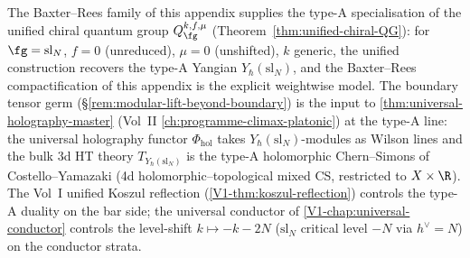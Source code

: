 \begin{remark}[Type-A Baxter--Rees family as the
$\fg = \mathrm{sl}_N$ specialisation of the unified $Q_\fg^{k,f,\mu}$;
\ClaimStatusConditional]
\label{rem:typeA-baxter-rees-uhm}
The Baxter--Rees family of this appendix supplies the type-A
specialisation of the unified chiral quantum group
$Q_\fg^{k,f,\mu}$
(Theorem~\ref{thm:unified-chiral-QG}): for
$\fg = \mathrm{sl}_N$, $f = 0$ (unreduced), $\mu = 0$ (unshifted),
$k$ generic, the unified construction recovers the type-A Yangian
$Y_\hbar(\mathrm{sl}_N)$, and the Baxter--Rees compactification
of this appendix is the explicit weightwise model. The boundary
tensor germ
(\S\ref{rem:modular-lift-beyond-boundary}) is the input to
\cref{thm:universal-holography-master} (Vol~II
\cref{ch:programme-climax-platonic}) at the type-A line: the universal
holography functor $\Phi_{\mathrm{hol}}$ takes
$Y_\hbar(\mathrm{sl}_N)$-modules as Wilson lines and the bulk
$3$d HT theory $T_{Y_\hbar(\mathrm{sl}_N)}$ is the type-A holomorphic
Chern--Simons of Costello--Yamazaki (4d holomorphic--topological
mixed CS, restricted to $X\times\R$). The Vol~I unified Koszul
reflection (\cref{V1-thm:koszul-reflection}) controls the
type-A duality on the bar side; the universal conductor of
\cref{V1-chap:universal-conductor} controls the level-shift
$k\mapsto -k - 2N$ ($\mathrm{sl}_N$ critical level $-N$ via
$h^\vee = N$) on the conductor strata.
\end{remark}
